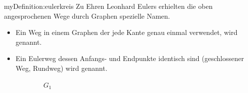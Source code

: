 \begin{mydefinition}{myDefinition:eulerkreis}
Zu Ehren Leonhard Eulers erhielten die oben angesprochenen Wege durch Graphen spezielle Namen.
\begin{itemize}
    \item Ein Weg in einem Graphen der jede Kante genau einmal verwendet, wird  genannt.
    \item Ein Eulerweg dessen Anfangs- und Endpunkte identisch sind (geschlossener Weg, Rundweg) wird  genannt.
\end{itemize}
\end{mydefinition}

\clearpage
\begin{myexercise}\label{aufgabe:04}
\begin{figure}[H]
     \centering
\begin{subfigure}[b]{0.4\textwidth}
\centering
{}%
\caption*{$G_1$}
\end{subfigure}
     \hfill
\begin{subfigure}[b]{0.4\textwidth}
\centering
{}
\end{subfigure}
\end{figure}
\end{myexercise}
